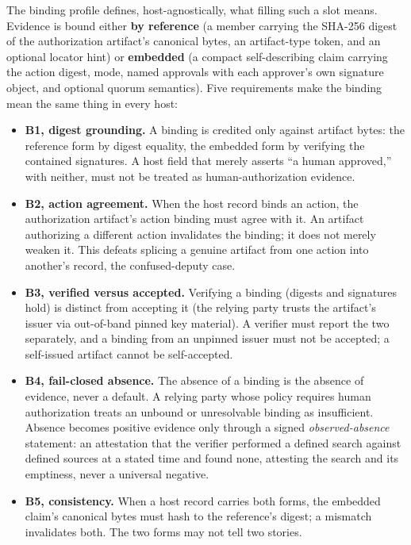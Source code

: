\documentclass[11pt]{article}
\begin{document}
The binding profile defines, host-agnostically, what filling such a slot means.
Evidence is bound either \textbf{by reference} (a member carrying the SHA-256
digest of the authorization artifact's canonical bytes, an artifact-type token,
and an optional locator hint) or \textbf{embedded} (a compact self-describing
claim carrying the action digest, mode, named approvals with each approver's own
signature object, and optional quorum semantics). Five requirements make the
binding mean the same thing in every host:

\begin{itemize}[leftmargin=*]
\item \textbf{B1, digest grounding.} A binding is credited only against artifact
bytes: the reference form by digest equality, the embedded form by verifying the
contained signatures. A host field that merely asserts ``a human approved,'' with
neither, must not be treated as human-authorization evidence.
\item \textbf{B2, action agreement.} When the host record binds an action, the
authorization artifact's action binding must agree with it. An artifact
authorizing a different action invalidates the binding; it does not merely weaken
it. This defeats splicing a genuine artifact from one action into another's
record, the confused-deputy case.
\item \textbf{B3, verified versus accepted.} Verifying a binding (digests and
signatures hold) is distinct from accepting it (the relying party trusts the
artifact's issuer via out-of-band pinned key material). A verifier must report the
two separately, and a binding from an unpinned issuer must not be accepted; a
self-issued artifact cannot be self-accepted.
\item \textbf{B4, fail-closed absence.} The absence of a binding is the absence of
evidence, never a default. A relying party whose policy requires human
authorization treats an unbound or unresolvable binding as insufficient. Absence
becomes positive evidence only through a signed \emph{observed-absence} statement:
an attestation that the verifier performed a defined search against defined
sources at a stated time and found none, attesting the search and its emptiness,
never a universal negative.
\item \textbf{B5, consistency.} When a host record carries both forms, the
embedded claim's canonical bytes must hash to the reference's digest; a mismatch
invalidates both. The two forms may not tell two stories.
\end{itemize}
\end{document}

